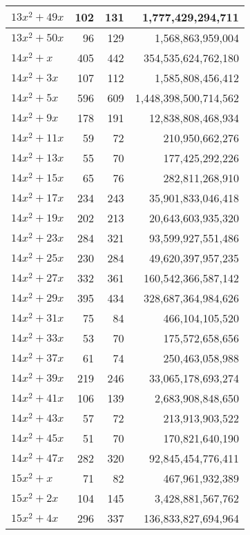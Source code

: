 \documentclass[a4paper]{amsproc}
\theoremstyle{plain}
\begin{document}
\begin{longtable}{ | l | r | r | r | }
$13x^2 + 49x$ & 102 & 131 & 1{,}777{,}429{,}294{,}711 \\ \hline
$13x^2 + 50x$ & 96 & 129 & 1{,}568{,}863{,}959{,}004 \\ \hline
$14x^2 + x$ & 405 & 442 & 354{,}535{,}624{,}762{,}180 \\ \hline
$14x^2 + 3x$ & 107 & 112 & 1{,}585{,}808{,}456{,}412 \\ \hline
$14x^2 + 5x$ & 596 & 609 & 1{,}448{,}398{,}500{,}714{,}562 \\ \hline
$14x^2 + 9x$ & 178 & 191 & 12{,}838{,}808{,}468{,}934 \\ \hline
$14x^2 + 11x$ & 59 & 72 & 210{,}950{,}662{,}276 \\ \hline
$14x^2 + 13x$ & 55 & 70 & 177{,}425{,}292{,}226 \\ \hline
$14x^2 + 15x$ & 65 & 76 & 282{,}811{,}268{,}910 \\ \hline
$14x^2 + 17x$ & 234 & 243 & 35{,}901{,}833{,}046{,}418 \\ \hline
$14x^2 + 19x$ & 202 & 213 & 20{,}643{,}603{,}935{,}320 \\ \hline
$14x^2 + 23x$ & 284 & 321 & 93{,}599{,}927{,}551{,}486 \\ \hline
$14x^2 + 25x$ & 230 & 284 & 49{,}620{,}397{,}957{,}235 \\ \hline
$14x^2 + 27x$ & 332 & 361 & 160{,}542{,}366{,}587{,}142 \\ \hline
$14x^2 + 29x$ & 395 & 434 & 328{,}687{,}364{,}984{,}626 \\ \hline
$14x^2 + 31x$ & 75 & 84 & 466{,}104{,}105{,}520 \\ \hline
$14x^2 + 33x$ & 53 & 70 & 175{,}572{,}658{,}656 \\ \hline
$14x^2 + 37x$ & 61 & 74 & 250{,}463{,}058{,}988 \\ \hline
$14x^2 + 39x$ & 219 & 246 & 33{,}065{,}178{,}693{,}274 \\ \hline
$14x^2 + 41x$ & 106 & 139 & 2{,}683{,}908{,}848{,}650 \\ \hline
$14x^2 + 43x$ & 57 & 72 & 213{,}913{,}903{,}522 \\ \hline
$14x^2 + 45x$ & 51 & 70 & 170{,}821{,}640{,}190 \\ \hline
$14x^2 + 47x$ & 282 & 320 & 92{,}845{,}454{,}776{,}411 \\ \hline
$15x^2 + x$ & 71 & 82 & 467{,}961{,}932{,}389 \\ \hline
$15x^2 + 2x$ & 104 & 145 & 3{,}428{,}881{,}567{,}762 \\ \hline
$15x^2 + 4x$ & 296 & 337 & 136{,}833{,}827{,}694{,}964 \\ \hline

\end{longtable}
\end{document}
